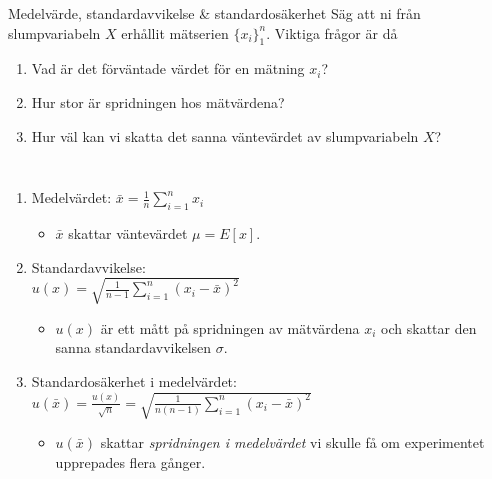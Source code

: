 \documentclass[9pt]{beamer}
\newcommand*\mean[1]{\bar{#1}}
\begin{document}
    \begin{frame}{Medelvärde, standardavvikelse \& standardosäkerhet}
        \onslide<+->
        Säg att ni från slumpvariabeln $X$ erhållit mätserien $\{x_i\}_1^n$. Viktiga frågor är då
        
        \begin{enumerate}
            \item Vad är det förväntade värdet för en mätning $x_i$?
            \item Hur stor är spridningen hos mätvärdena?
            \item Hur väl kan vi skatta det sanna väntevärdet av slumpvariabeln $X$?
        \end{enumerate}

        \vfill

        \begin{columns}[T]
        
            \begin{enumerate}
                \item<+-> Medelvärdet: $\mean{x} = \frac1n \sum\limits_{i=1}^n x_i$
                    \begin{itemize}
                        \item $\mean{x}$ skattar väntevärdet $\mu=E[x]$.
                    \end{itemize}
                \item<+-> Standardavvikelse: \\
                    \vspace{0.5em}
                    $u(x) = \sqrt{\frac1{n-1} \sum\limits_{i=1}^n \left(x_i - \mean{x}\right)^2}$
                    \vspace{0.5em}
                    \begin{itemize}
                        \item $u(x)$ är ett mått på spridningen av mätvärdena $x_i$ och skattar den sanna standardavvikelsen $\sigma$.
                    \end{itemize}
                \item<+-> Standardosäkerhet i medelvärdet: \\
                    \vspace{0.5em}
                    $u(\mean{x}) = \frac{u(x)}{\sqrt{n}} = \sqrt{\frac1{n(n-1)} \sum_{i=1}^n \left(x_i - \mean{x}\right)^2}$
                    \vspace{0.5em}
                    \begin{itemize}
                        \item $u(\mean{x})$ skattar \emph{spridningen i medelvärdet} vi skulle få om experimentet upprepades flera gånger.
                    \end{itemize}
            \end{enumerate}
            

\end{columns}
\end{frame}
\end{document}
